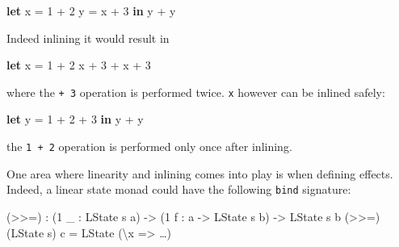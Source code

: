 \documentclass[
]{article}
\newenvironment{Shaded}{}{}
\newcommand{\DataTypeTok}[1]{\textcolor[rgb]{0.56,0.13,0.00}{#1}}
\newcommand{\DecValTok}[1]{\textcolor[rgb]{0.25,0.63,0.44}{#1}}
\newcommand{\KeywordTok}[1]{\textcolor[rgb]{0.00,0.44,0.13}{\textbf{#1}}}
\newcommand{\NormalTok}[1]{#1}
\newcommand{\OperatorTok}[1]{\textcolor[rgb]{0.40,0.40,0.40}{#1}}
\newcommand{\OtherTok}[1]{\textcolor[rgb]{0.00,0.44,0.13}{#1}}
\begin{document}
\begin{Shaded}
\begin{Highlighting}[]
\KeywordTok{let}\NormalTok{ x }\OtherTok{=} \DecValTok{1} \OperatorTok{+} \DecValTok{2}
\NormalTok{    y }\OtherTok{=}\NormalTok{ x }\OperatorTok{+} \DecValTok{3} \KeywordTok{in}
\NormalTok{    y }\OperatorTok{+}\NormalTok{ y}
\end{Highlighting}
\end{Shaded}

Indeed inlining it would result in

\begin{Shaded}
\begin{Highlighting}[]
\KeywordTok{let}\NormalTok{ x }\OtherTok{=} \DecValTok{1} \OperatorTok{+} \DecValTok{2}
\NormalTok{    x }\OperatorTok{+} \DecValTok{3} \OperatorTok{+}\NormalTok{ x }\OperatorTok{+} \DecValTok{3}
\end{Highlighting}
\end{Shaded}

where the \texttt{+\ 3} operation is performed twice. \texttt{x} however
can be inlined safely:

\begin{Shaded}
\begin{Highlighting}[]
\KeywordTok{let}\NormalTok{ y }\OtherTok{=} \DecValTok{1} \OperatorTok{+} \DecValTok{2} \OperatorTok{+} \DecValTok{3} \KeywordTok{in}
\NormalTok{    y }\OperatorTok{+}\NormalTok{ y}
\end{Highlighting}
\end{Shaded}

the \texttt{1\ +\ 2} operation is performed only once after inlining.

One area where linearity and inlining comes into play is when defining
effects. Indeed, a linear state monad could have the following
\texttt{bind} signature:

\begin{Shaded}
\begin{Highlighting}[]
\NormalTok{(}\OperatorTok{\textgreater{}\textgreater{}=}\NormalTok{) }\OperatorTok{:}\NormalTok{ (}\DecValTok{1}\NormalTok{ \_ }\OperatorTok{:} \DataTypeTok{LState}\NormalTok{ s a) }\OtherTok{{-}\textgreater{}}\NormalTok{ (}\DecValTok{1}\NormalTok{ f }\OperatorTok{:}\NormalTok{ a }\OtherTok{{-}\textgreater{}} \DataTypeTok{LState}\NormalTok{ s b) }\OtherTok{{-}\textgreater{}} \DataTypeTok{LState}\NormalTok{ s b}
\NormalTok{(}\OperatorTok{\textgreater{}\textgreater{}=}\NormalTok{) (}\DataTypeTok{LState}\NormalTok{ s) c }\OtherTok{=} \DataTypeTok{LState}\NormalTok{ (\textbackslash{}x }\OtherTok{=\textgreater{}}\NormalTok{ …)}
\end{Highlighting}
\end{Shaded}
\end{document}
